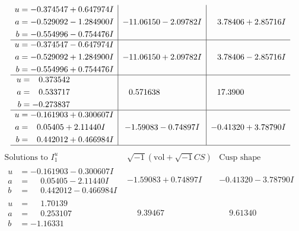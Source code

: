 \documentclass[1p]{elsarticle_modified}
\theoremstyle{definition}
\newcommand{\I}{\sqrt{-1}}
\begin{document}
$$\begin{array}{c|c|c}
\begin{aligned}
u &= -0.374547 + 0.647974 I \\
a &= -0.529092 - 1.284900 I \\
b &= -0.554996 - 0.754476 I\end{aligned}
 & -11.06150 - 2.09782 I & \phantom{-}3.78406 + 2.85716 I \\ \hline\begin{aligned}
u &= -0.374547 - 0.647974 I \\
a &= -0.529092 + 1.284900 I \\
b &= -0.554996 + 0.754476 I\end{aligned}
 & -11.06150 + 2.09782 I & \phantom{-}3.78406 - 2.85716 I \\ \hline\begin{aligned}
u &= \phantom{-}0.373542\phantom{ +0.000000I} \\
a &= \phantom{-}0.533717\phantom{ +0.000000I} \\
b &= -0.273837\phantom{ +0.000000I}\end{aligned}
 & \phantom{-}0.571638\phantom{ +0.000000I} & \phantom{-}17.3900\phantom{ +0.000000I} \\ \hline\begin{aligned}
u &= -0.161903 + 0.300607 I \\
a &= \phantom{-}0.05405 + 2.11440 I \\
b &= \phantom{-}0.442012 + 0.466984 I\end{aligned}
 & -1.59083 - 0.74897 I & -0.41320 + 3.78790 I\\
 \hline 
 \end{array}$$\newpage$$\begin{array}{c|c|c}  
\text{Solutions to }I^u_{1}& \I (\text{vol} + \sqrt{-1}CS) & \text{Cusp shape}\\
 \hline 
\begin{aligned}
u &= -0.161903 - 0.300607 I \\
a &= \phantom{-}0.05405 - 2.11440 I \\
b &= \phantom{-}0.442012 - 0.466984 I\end{aligned}
 & -1.59083 + 0.74897 I & -0.41320 - 3.78790 I \\ \hline\begin{aligned}
u &= \phantom{-}1.70139\phantom{ +0.000000I} \\
a &= \phantom{-}0.253107\phantom{ +0.000000I} \\
b &= -1.16331\phantom{ +0.000000I}\end{aligned}
 & \phantom{-}9.39467\phantom{ +0.000000I} & \phantom{-}9.61340\phantom{ +0.000000I} \\ \hline\begin{aligned}

\end{aligned}
\end{array}$$
\end{document}
